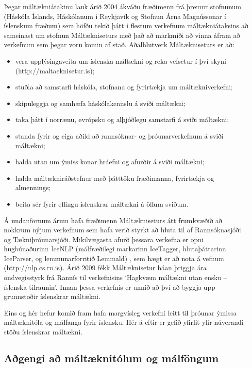 \documentclass{../../metanetpaper}
\begin{document}
\begin{multicols}{2}
Þegar máltækniátakinu lauk árið 2004 ákváðu fræðimenn frá þremur stofnunum (Háskóla Íslands, Háskólanum í Reykjavík og Stofnun Árna Magnússonar í íslenskum fræðum) sem höfðu tekið þátt í flestum verkefnum máltækniátaksins að sameinast um stofnun Máltækniseturs með það að markmiði að vinna áfram að verkefnum sem þegar voru komin af stað. Aðalhlutverk Máltækniseturs er að:

\begin{itemize}
\item vera upplýsingaveita um íslenska máltækni og reka vefsetur í því skyni (http://maltaeknisetur.is); 
\item stuðla að samstarfi háskóla, stofnana og fyrirtækja um máltækniverkefni;
\item skipuleggja og samhæfa háskólakennslu á sviði máltækni;
\item taka þátt í norrænu, evrópsku og alþjóðlegu samstarfi á sviði máltækni;
\item standa fyrir og eiga aðild að rannsóknar- og þróunarverkefnum á sviði máltækni;
\item halda utan um ýmiss konar hráefni og afurðir á sviði máltækni;
\item halda máltækniráðstefnur með þátttöku fræðimanna, fyrirtækja og almennings;
\item beita sér fyrir eflingu íslenskrar máltækni á öllum sviðum.
\end{itemize}

Á undanförnum árum hafa fræðimenn Máltækniseturs átt frumkvæðið að nokkrum nýjum verkefnum sem hafa verið styrkt að hluta til af Rannsóknasjóði og Tækniþróunarsjóði. Mikilvægasta afurð þessara verkefna er opni hugbúnaðurinn IceNLP (málfræðilegi markarinn IceTagger, hlutaþáttarinn IceParser, og lemmunarforritið Lemmald) \cite{icenlp1}, sem hægt er að nota á vefnum (http://nlp.cs.ru.is). Árið 2009 fékk Máltæknisetur háan þriggja ára öndvegisstyrk frá Rannís til verkefnisins ‘Hagkvæm máltækni utan ensku -- íslenska tilraunin’. Innan þessa verkefnis er unnið að því að byggja upp grunnstoðir íslenskrar máltækni.

Eins og hér hefur komið fram hafa margvísleg verkefni leitt til þróunar ýmissa máltæknitóla og málfanga fyrir íslensku. Hér á eftir er gefið yfirlit yfir núverandi stöðu íslenskrar máltækni.

\subsection{Aðgengi að máltæknitólum og málföngum}


\end{multicols}
\end{document}
